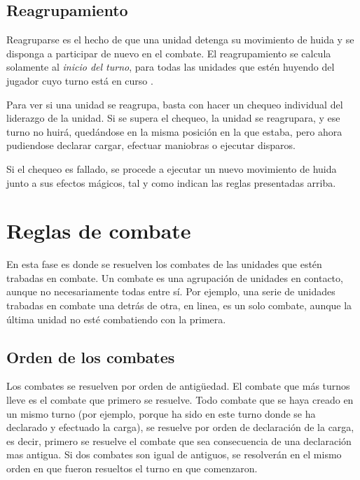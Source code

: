 \subsection*{Reagrupamiento}
\label{reagrupamiento}
Reagruparse es el hecho de que una unidad detenga su movimiento de
huida y se disponga a participar de nuevo en el combate. El
reagrupamiento se calcula solamente al \emph{inicio del turno}, para
todas las unidades que estén huyendo del jugador cuyo turno está en
curso .

Para ver si una unidad se reagrupa, basta con hacer un chequeo
individual del liderazgo de la unidad. Si se supera el chequeo, la
unidad se reagrupara, y ese turno no huirá, quedándose en la misma
posición en la que estaba, pero ahora pudiendose declarar cargar,
efectuar maniobras o ejecutar disparos.

Si el chequeo es fallado, se procede a ejecutar un nuevo movimiento de
huida junto a sus efectos mágicos, tal y como indican las reglas presentadas arriba.


\section*{Reglas de combate}
\label{combate}
En esta fase es donde se resuelven los combates de las unidades que
estén trabadas en combate. Un combate es una agrupación de unidades
en contacto, aunque no necesariamente todas entre sí. Por ejemplo, una
serie de unidades trabadas en combate una detrás de otra, en linea, es
un solo combate, aunque la última unidad no esté combatiendo con la
primera.

\subsection*{Orden de los combates}
\label{ordencombates}
Los combates se resuelven por orden de antigüedad. El combate que más
turnos lleve es el combate que primero se resuelve. Todo combate que
se haya creado en un mismo turno (por ejemplo, porque ha sido en este turno
donde se ha declarado y efectuado la carga), se resuelve por orden
de declaración de la carga, es decir, primero se resuelve el combate
que sea consecuencia de una declaración mas antigua. Si dos combates
son igual de antiguos, se resolverán en el mismo orden en que fueron
resueltos el turno en que comenzaron.

